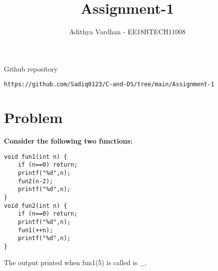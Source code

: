 \documentclass[journal,12pt,twocolumn]{IEEEtran}
\begin{document}
     \def\rightbox#1{\makebox[0in][r]{#1}}
     \def\centbox#1{\makebox[0in]{#1}}
     \def\topbox#1{\raisebox{-\baselineskip}[0in][0in]{#1}}
     \def\midbox#1{\raisebox{-0.5\baselineskip}[0in][0in]{#1}}
\vspace{3cm}
\title{Assignment-1}
\author{Adithya Vardhan - EE18BTECH11008}
\maketitle
\newpage
\bigskip
\renewcommand{\thefigure}{\theenumi}
\renewcommand{\thetable}{\theenumi}
Github repository
\begin{lstlisting}
https://github.com/Sadiq0123/C-and-DS/tree/main/Assignment-1
\end{lstlisting}
%
\section{\textbf{Problem}}
\textbf{Consider the following two functions:}
\begin{tcolorbox}
\begin{verbatim}
void fun1(int n) {
    if (n==0) return;
    printf("%d",n);
    fun2(n-2);
    printf("%d",n);
}
void fun2(int n) {
    if (n==0) return;
    printf("%d",n);
    fun1(++n);
    printf("%d",n);
}
\end{verbatim}
\end{tcolorbox}
The output printed when fun1(5) is called is \_.
\end{document}
